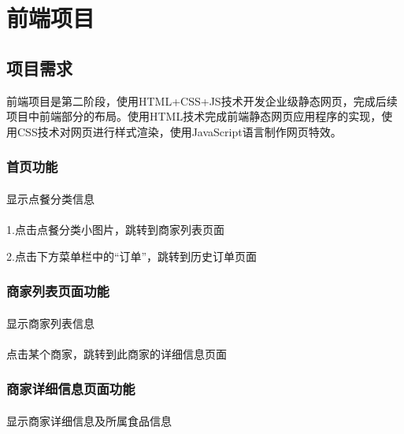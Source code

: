 
\chapter{前端项目}

\section{项目需求}

前端项目是第二阶段，使用HTML+CSS+JS技术开发企业级静态网页，完成后续项目中前端部分的布局。使用HTML技术完成前端静态网页应用程序的实现，使用CSS技术对网页进行样式渲染，使用JavaScript语言制作网页特效。

\subsection{首页功能}
\subsubsection*{}
显示点餐分类信息
\subsubsection*{}
1.点击点餐分类小图片，跳转到商家列表页面

2.点击下方菜单栏中的“订单”，跳转到历史订单页面

\subsection{商家列表页面功能}
\subsubsection*{}
显示商家列表信息
\subsubsection*{}
点击某个商家，跳转到此商家的详细信息页面

\subsection{商家详细信息页面功能}
\subsubsection*{}
显示商家详细信息及所属食品信息
